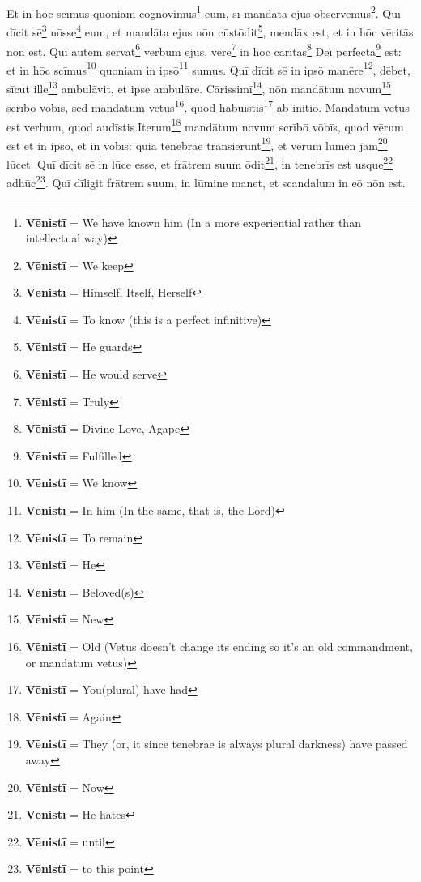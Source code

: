  Et in hōc scīmus quoniam cognōvimus\footnote{\textbf{Vēnistī} = We have known him (In a more experiential rather than intellectual way)} eum, sī mandāta ejus observēmus\footnote{\textbf{Vēnistī} = We keep}. Quī dīcit sē\footnote{\textbf{Vēnistī} = Himself, Itself, Herself} nōsse\footnote{\textbf{Vēnistī} = To know (this is a perfect infinitive)} eum, et mandāta ejus nōn cūstōdit\footnote{\textbf{Vēnistī} = He guards}, mendāx est, et in hōc vēritās nōn est. Quī autem servat\footnote{\textbf{Vēnistī} = He would serve} verbum ejus, vērē\footnote{\textbf{Vēnistī} = Truly} in hōc cāritās\footnote{\textbf{Vēnistī} = Divine Love, Agape} Deī perfecta\footnote{\textbf{Vēnistī} = Fulfilled} est: et in hōc scīmus\footnote{\textbf{Vēnistī} = We know} quoniam in ipsō\footnote{\textbf{Vēnistī} = In him (In the same, that is, the Lord)} sumus. Quī dīcit sē in ipsō manēre\footnote{\textbf{Vēnistī} = To remain}, dēbet, sīcut ille\footnote{\textbf{Vēnistī} = He} ambulāvit, et ipse ambulāre. Cārissimī\footnote{\textbf{Vēnistī} = Beloved(s)}, nōn mandātum novum\footnote{\textbf{Vēnistī} = New} scrībō vōbīs, sed mandātum vetus\footnote{\textbf{Vēnistī} = Old (Vetus doesn't change its ending so it's an old commandment, or mandatum vetus)}, quod habuistis\footnote{\textbf{Vēnistī} = You(plural) have had} ab initiō. Mandātum vetus est verbum, quod audīstis.Iterum\footnote{\textbf{Vēnistī} = Again} mandātum novum scrībō vōbīs, quod vērum est et in ipsō, et in vōbīs: quia tenebrae trānsiērunt\footnote{\textbf{Vēnistī} = They (or, it since tenebrae is always plural darkness) have passed away}, et vērum lūmen jam\footnote{\textbf{Vēnistī} = Now} lūcet. Quī dīcit sē in lūce esse, et frātrem suum ōdit\footnote{\textbf{Vēnistī} = He hates}, in tenebrīs est usque\footnote{\textbf{Vēnistī} = until} adhūc\footnote{\textbf{Vēnistī} = to this point}. Quī dīligit frātrem suum, in lūmine manet, et scandalum in eō nōn est.
